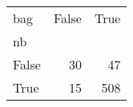 \begin{tabular}{lrr}
\toprule
bag &  False &  True  \\
nb    &        &        \\
\midrule
False &     30 &     47 \\
True  &     15 &    508 \\
\bottomrule
\end{tabular}
